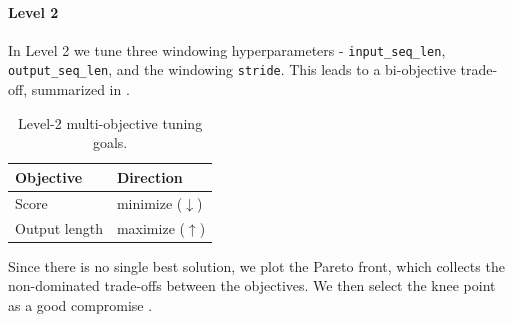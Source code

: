 \paragraph{Level 2}

In Level 2 we tune three windowing hyperparameters - \texttt{input\_seq\_len}, \texttt{output\_seq\_len}, and the windowing \texttt{stride}. 
This leads to a bi-objective trade-off, summarized in .

\begin{table}[H]
\centering
\small
\caption{Level-2 multi-objective tuning goals.}
\label{tab:l2_objectives}
\begin{tabular}{ll}
\toprule
Objective & Direction \\
\midrule
Score  & minimize ($\downarrow$) \\
Output length  & maximize ($\uparrow$) \\
\bottomrule
\end{tabular}
\end{table}

Since there is no single best solution, we plot the Pareto front, which collects the non-dominated trade-offs between the objectives. We then select the knee point as a good compromise \cite{deb2002nsga2}.





